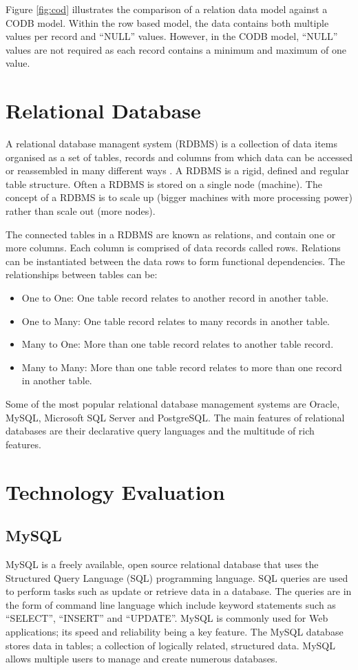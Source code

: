 Figure \ref{fig:cod} illustrates the comparison of a relation data model against a CODB model. Within the row based model, the data contains both multiple values per record and ``NULL'' values. However, in the CODB model, ``NULL'' values are not required as each record contains a minimum and maximum of one value.

\section{Relational Database}
A relational database managent system (RDBMS) is a collection of data items organised as a set of tables, records and columns from which data can be accessed or reassembled in many different ways \cite{rdb}. A RDBMS is a rigid, defined and regular table structure. Often a RDBMS is stored on a single node (machine). The concept of a RDBMS is to scale up (bigger machines with more processing power) rather than scale out (more nodes).

The connected tables in a RDBMS are known as relations, and contain one or more columns. Each column is comprised of data records called rows. Relations can be instantiated between the data rows to form functional dependencies. The relationships between tables can be:

\begin{itemize}
\item One to One: One table record relates to another record in another table.
\item One to Many: One table record relates to many records in another table.
\item Many to One: More than one table record relates to another table record.
\item Many to Many: More than one table record relates to more than one record in another table.
\end{itemize}

Some of the most popular relational database management systems are Oracle, MySQL, Microsoft SQL Server and PostgreSQL. The main features of relational databases are their declarative query languages and the multitude of rich features.

\section{Technology Evaluation}\label{techeval}
\subsection{MySQL}\label{mysql}
MySQL is a freely available, open source relational database that uses the Structured Query Language (SQL) programming language. SQL queries are used to perform tasks such as update or retrieve data in a database. The queries are in the form of command line language which include keyword statements such as ``SELECT'', ``INSERT'' and ``UPDATE''. MySQL is commonly used for Web applications; its speed and reliability being a key feature. The MySQL database stores data in tables; a collection of logically related, structured data. MySQL allows multiple users to manage and create numerous databases.

